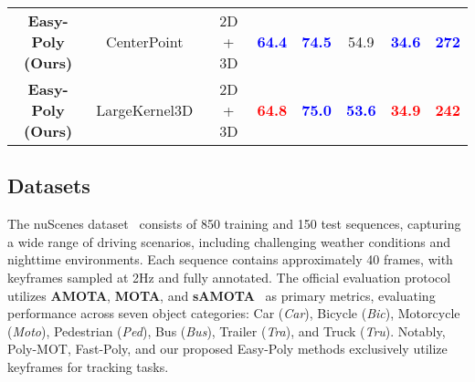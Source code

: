 \begin{table*}
\begin{center}
{\begin{tabular}{cccccccc}
\textbf{Easy-Poly (Ours)}       & CenterPoint~\cite{yin2021center} & 2D + 3D & \textbf{\textcolor{blue}{64.4}} & \textbf{\textcolor{blue}{74.5}}   & 54.9  & \textbf{\textcolor{blue}{34.6}} & \textbf{\textcolor{blue}{272}}   \\
\textbf{Easy-Poly (Ours)}       & LargeKernel3D~\cite{chen2022scaling}  & 2D + 3D  & \textbf{\textcolor{red}{64.8}} & \textbf{\textcolor{blue}{75.0}}    & \textbf{\textcolor{blue}{53.6}}  & \textbf{\textcolor{red}{34.9}}  & \textbf{\textcolor{red}{242}} \\ \hline
\end{tabular}}
\end{center}
\end{table*}

\subsection{Datasets}



The nuScenes dataset~\cite{caesar2020nuscenes} consists of 850 training and 150 test sequences, capturing a wide range of driving scenarios, including challenging weather conditions and nighttime environments. Each sequence contains approximately 40 frames, with keyframes sampled at 2Hz and fully annotated. The official evaluation protocol utilizes \textbf{AMOTA}, \textbf{MOTA}, and \textbf{sAMOTA}~\cite{weng20203d} as primary metrics, evaluating performance across seven object categories: Car (\textit{Car}), Bicycle (\textit{Bic}), Motorcycle (\textit{Moto}), Pedestrian (\textit{Ped}), Bus (\textit{Bus}), Trailer (\textit{Tra}), and Truck (\textit{Tru}). Notably, Poly-MOT, Fast-Poly, and our proposed Easy-Poly methods exclusively utilize keyframes for tracking tasks.

